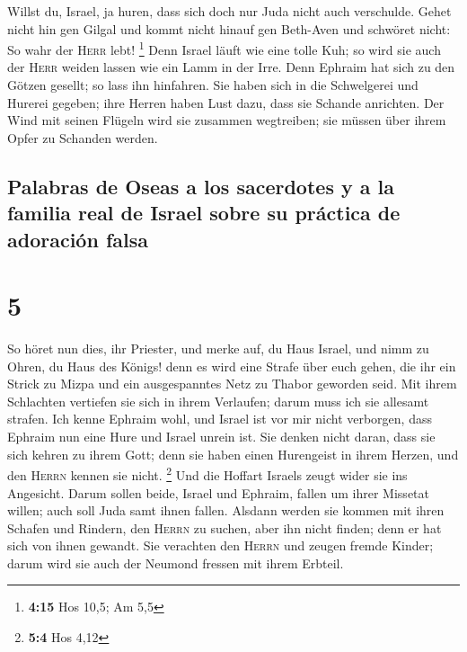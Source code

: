  Willst du, Israel, ja huren, dass sich doch nur Juda
nicht auch verschulde. Gehet nicht hin gen Gilgal und kommt nicht hinauf
gen Beth-Aven und schwöret nicht: So wahr der \textsc{Herr} lebt!
\footnote{\textbf{4:15} Hos 10,5; Am 5,5}  Denn Israel
läuft wie eine tolle Kuh; so wird sie auch der \textsc{Herr} weiden
lassen wie ein Lamm in der Irre.  Denn Ephraim hat sich
zu den Götzen gesellt; so lass ihn hinfahren.  Sie haben
sich in die Schwelgerei und Hurerei gegeben; ihre Herren haben Lust
dazu, dass sie Schande anrichten.  Der Wind mit seinen
Flügeln wird sie zusammen wegtreiben; sie müssen über ihrem Opfer zu
Schanden werden.

\hypertarget{palabras-de-oseas-a-los-sacerdotes-y-a-la-familia-real-de-israel-sobre-su-pruxe1ctica-de-adoraciuxf3n-falsa}{%
\subsection{Palabras de Oseas a los sacerdotes y a la familia real de
Israel sobre su práctica de adoración
falsa}\label{palabras-de-oseas-a-los-sacerdotes-y-a-la-familia-real-de-israel-sobre-su-pruxe1ctica-de-adoraciuxf3n-falsa}}

\hypertarget{section-4}{%
\section{5}\label{section-4}}

 So höret nun dies, ihr Priester, und merke auf, du Haus
Israel, und nimm zu Ohren, du Haus des Königs! denn es wird eine Strafe
über euch gehen, die ihr ein Strick zu Mizpa und ein ausgespanntes Netz
zu Thabor geworden seid.  Mit ihrem Schlachten vertiefen
sie sich in ihrem Verlaufen; darum muss ich sie allesamt strafen.
 Ich kenne Ephraim wohl, und Israel ist vor mir nicht
verborgen, dass Ephraim nun eine Hure und Israel unrein ist.
 Sie denken nicht daran, dass sie sich kehren zu ihrem
Gott; denn sie haben einen Hurengeist in ihrem Herzen, und den
\textsc{Herrn} kennen sie nicht. \footnote{\textbf{5:4} Hos 4,12}
 Und die Hoffart Israels zeugt wider sie ins Angesicht.
Darum sollen beide, Israel und Ephraim, fallen um ihrer Missetat willen;
auch soll Juda samt ihnen fallen.  Alsdann werden sie
kommen mit ihren Schafen und Rindern, den \textsc{Herrn} zu suchen, aber
ihn nicht finden; denn er hat sich von ihnen gewandt.  Sie
verachten den \textsc{Herrn} und zeugen fremde Kinder; darum wird sie
auch der Neumond fressen mit ihrem Erbteil.

